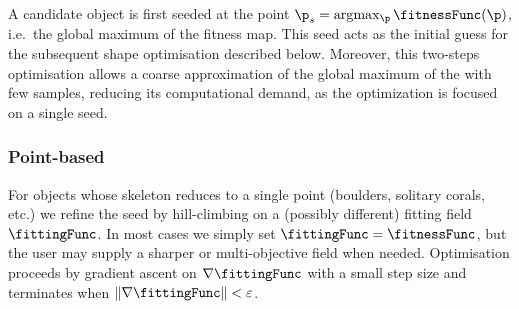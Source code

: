 \subsection{}

A candidate object is first seeded at the point $\p_s=\arg\!\max_\p \fitnessFunc(\p)$, i.e.\ the global maximum of the fitness map.  This seed acts as the initial guess for the subsequent shape optimisation described below. Moreover, this two-steps optimisation allows a coarse approximation of the global maximum of the  with few samples, reducing its computational demand, as the  optimization is focused on a single seed.

\subsubsection{Point-based }
For objects whose skeleton reduces to a single point (boulders, solitary corals, etc.) we refine the seed by hill-climbing on a (possibly different) fitting field $\fittingFunc$. In most cases we simply set $\fittingFunc=\fitnessFunc$, but the user may supply a sharper or multi-objective field when needed. Optimisation proceeds by gradient ascent on $\nabla\fittingFunc$ with a small step size and terminates when $\|\nabla \fittingFunc\|<\varepsilon$.

